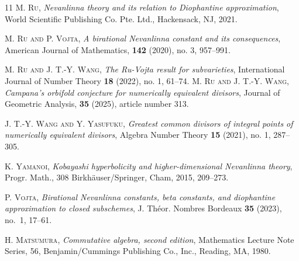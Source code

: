 \documentclass[10pt]{amsart}
\numberwithin{equation}{section}
\theoremstyle{plain}
\theoremstyle{definition}
\begin{document}
\begin{thebibliography}{11}
\textsc{M. Ru}, \textit{ Nevanlinna theory and its relation to Diophantine approximation}, World Scientific Publishing Co. Pte. Ltd., Hackensack, NJ, 2021.

\textsc{M. Ru and P. Vojta}, \textit{A birational Nevanlinna constant and its consequences}, American Journal of Mathematics, {\bf 142} (2020), no. 3, 957--991.

\textsc{M. Ru  and J. T.-Y. Wang}, \textit{The Ru-Vojta result for subvarieties}, International Journal of Number Theory  {\bf 18} (2022), no. 1, 61--74.
\textsc{M. Ru  and J. T.-Y. Wang}, \textit{Campana's orbifold conjecture for numerically equivalent divisors}, Journal of Geometric Analysis,  {\bf 35} (2025), article number 313.

\textsc{J. T.-Y. Wang and Y. Yasufuku}, \textit{Greatest common divisors of integral points of numerically equivalent divisors}, Algebra Number Theory {\bf 15} (2021), no. 1, 287--305.

 \textsc{K. Yamanoi},  
\textit{Kobayashi hyperbolicity and higher-dimensional Nevanlinna theory}, 
Progr. Math., 308
Birkh\"auser/Springer, Cham, 2015, 209--273.


 \textsc{P. Vojta},  
\textit{Birational Nevanlinna constants, beta constants, and diophantine approximation to closed subschemes}, 
J. Th\'eor. Nombres Bordeaux {\bf 35} (2023), no.~1, 17--61.

 \textsc{H. Matsumura},  
\textit{Commutative algebra, second edition}, 
Mathematics Lecture Note Series, 56, Benjamin/Cummings Publishing Co., Inc., Reading, MA, 1980.


\end{thebibliography}


 
\end{document}
